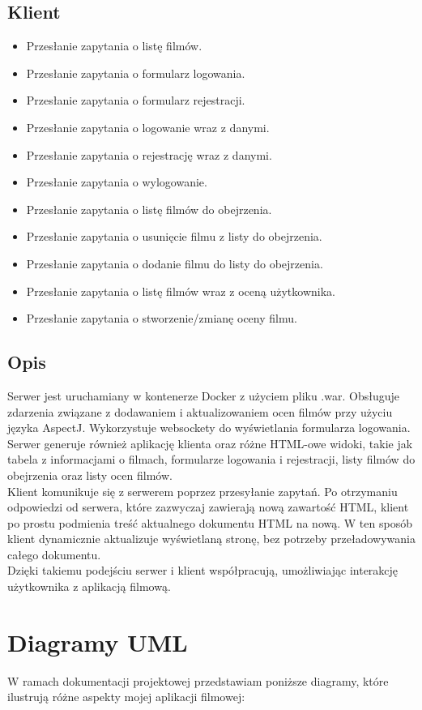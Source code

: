 \documentclass{article}
\begin{document}
\subsection{Klient}
\begin{itemize}
\item Przesłanie zapytania o listę filmów.
\item Przesłanie zapytania o formularz logowania.
\item Przesłanie zapytania o formularz rejestracji.
\item Przesłanie zapytania o logowanie wraz z danymi.
\item Przesłanie zapytania o rejestrację wraz z danymi.
\item Przesłanie zapytania o wylogowanie.
\item Przesłanie zapytania o listę filmów do obejrzenia.
\item Przesłanie zapytania o usunięcie filmu z listy do obejrzenia.
\item Przesłanie zapytania o dodanie filmu do listy do obejrzenia.
\item Przesłanie zapytania o listę filmów wraz z oceną użytkownika.
\item Przesłanie zapytania o stworzenie/zmianę oceny filmu.
\end{itemize}

\subsection{Opis}
Serwer jest uruchamiany w kontenerze Docker z użyciem pliku .war. Obsługuje zdarzenia związane z dodawaniem i aktualizowaniem ocen filmów przy użyciu języka AspectJ. Wykorzystuje websockety do wyświetlania formularza logowania. Serwer generuje również aplikację klienta oraz różne HTML-owe widoki, takie jak tabela z informacjami o filmach, formularze logowania i rejestracji, listy filmów do obejrzenia oraz listy ocen filmów. \\
Klient komunikuje się z serwerem poprzez przesyłanie zapytań. Po otrzymaniu odpowiedzi od serwera, które zazwyczaj zawierają nową zawartość HTML, klient po prostu podmienia treść aktualnego dokumentu HTML na nową. W ten sposób klient dynamicznie aktualizuje wyświetlaną stronę, bez potrzeby przeładowywania całego dokumentu. \\
Dzięki takiemu podejściu serwer i klient współpracują, umożliwiając interakcję użytkownika z aplikacją filmową.

\section{Diagramy UML}
W ramach dokumentacji projektowej przedstawiam poniższe diagramy, które ilustrują różne aspekty mojej aplikacji filmowej:
\end{document}
